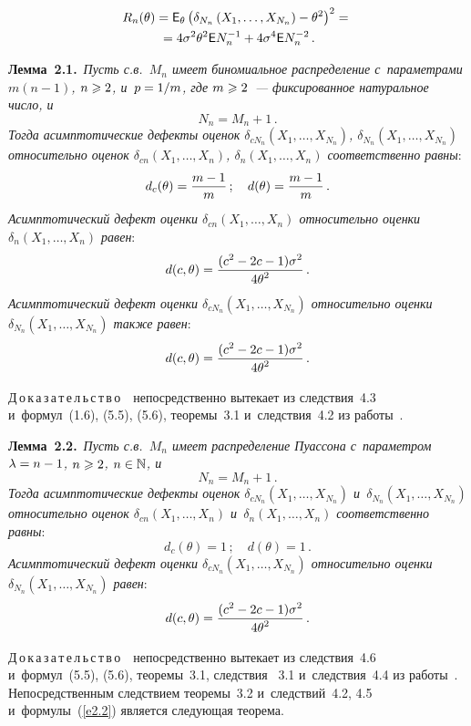 \begin{multicols}{2}
\vspace*{-12pt}

\noindent
\begin{multline*}
R_{n}(\theta) = {\sf E}_\theta \left(\delta_{N_n}\left(X_1,\ldots,X_{N_n}\right) - 
\theta^2\right)^2 ={}\\
{}=
4\sigma^2\theta^2 {\sf E} N_n^{-1} + 4\sigma^4 {\sf E} N_n^{-2}\,.
\end{multline*}

\noindent
\textbf{Лемма~2.1.}\
\textit{Пусть с.в.~$M_n$ имеет биномиальное распределение 
с~параметрами $m(n-1)$, $n\hm \geqslant 2$, и~$p\hm = 1/m$, где $m\hm \geqslant 2$~--- фиксированное натуральное число, и}
$$
N_n = M_n + 1\,.
$$
\textit{Тогда асимптотические дефекты оценок
$\delta_{cN_n}(X_1,\ldots,X_{N_n})$, $\delta_{N_n}(X_1,\ldots,X_{N_n})$ 
относительно оценок
$\delta_{cn}(X_1,\ldots,X_{n})$, $\delta_{n}(X_1,\ldots,X_{n})$ 
соответственно равны}:
$$
d_c(\theta) = \displaystyle\frac{\displaystyle m - 1\mathstrut}{\displaystyle m\mathstrut}\,;\quad d(\theta) = \displaystyle\frac{\displaystyle m - 1\mathstrut}{\displaystyle m\mathstrut}\,.
$$
\textit{Асимптотический дефект оценки
$\delta_{cn}(X_1,\ldots,X_{n})$ относительно оценки
$\delta_{n}(X_1,\ldots,X_{n})$ равен}:
$$
d(c, \theta) = \displaystyle\frac{\displaystyle (c^2 - 2c - 1)\sigma^2\mathstrut}{\displaystyle 4\theta^2\mathstrut}\,.
$$
\textit{Асимптотический дефект оценки
$\delta_{cN_{n}}(X_1,\ldots,X_{N_n})$ относительно оценки
$\delta_{N_{n}}(X_1,\ldots,X_{N_n})$ также равен}:
$$
d(c, \theta) = \displaystyle\frac{\displaystyle (c^2 - 2c - 1)\sigma^2\mathstrut}{\displaystyle 4\theta^2\mathstrut}\,.
$$


\noindent
Д\,о\,к\,а\,з\,а\,т\,е\,л\,ь\,с\,т\,в\,о~~непосредственно 
вытекает из следствия~4.3 и~формул~(1.6), 
(5.5), (5.6), теоремы~3.1 и~следствия~4.2 из работы~\cite{2-ben}.

\smallskip


\noindent
\textbf{Лемма~2.2.}\
\textit{Пусть с.в.~$M_n$ имеет распределение Пуассона 
с~параметром $\lambda\hm = n\hm - 1$, $n\hm \geqslant 2$, $n\hm \in \mathbb{N}$, и}
$$
N_n = M_n + 1\,.
$$
\textit{Тогда асимптотические дефекты оценок
$\delta_{cN_n}(X_1,\ldots,X_{N_n})$ 
 и~$\delta_{N_n}(X_1,\ldots,X_{N_n})$ относительно оценок
$\delta_{cn}(X_1,\ldots,X_{n})$ и~$\delta_{n}(X_1,\ldots,X_{n})$ 
соответственно равны}:
$$
d_c(\theta) = 1\,;\quad d(\theta) = 1\,.
$$
\textit{Асимптотический дефект оценки
$\delta_{cN_{n}}(X_1,\ldots,X_{N_{n}})$ относительно оценки
$\delta_{N_{n}}(X_1,\ldots,X_{N_{n}})$ равен}:
$$
d(c, \theta) = \displaystyle\frac{\displaystyle (c^2 - 2c - 1)\sigma^2\mathstrut}{\displaystyle 4\theta^2\mathstrut}\,.
$$

\noindent
Д\,о\,к\,а\,з\,а\,т\,е\,л\,ь\,с\,т\,в\,о~~непосредственно 
вытекает из следствия~4.6 и~формул~(5.5), (5.6), 
теоремы~3.1, следствия~ 3.1 и~следствия~4.4 из работы~\cite{2-ben}.
Непосредственным следствием теоремы~3.2 и~следствий~4.2, 4.5~\cite{2-ben}
и~формулы~(\ref{e2.2}) является следующая теорема.


\end{multicols}

